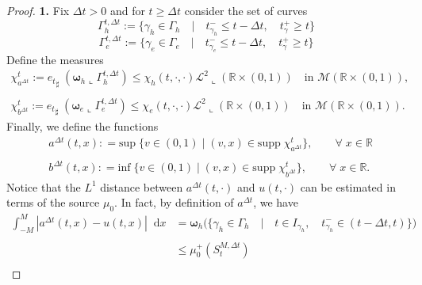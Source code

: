 \documentclass[10pt,a4paper]{amsart}
\newcommand*\dif{\mathop{}\!\mathrm{d}}
\newcommand{\bs}[1]{\boldsymbol{#1}}
\newcommand{\mr}[1]{\mathrm{#1}}
\newcommand{\msc}[1]{\mathscr{#1}}
\begin{document}
\begin{proof}
\vspace{0.5cm}
\textbf{1.} Fix $\Delta t > 0$ and for $t \geq \Delta t$ consider the set of curves
$$
\Gamma_h^{t, \Delta t} := \Big\{ \gamma_h \in \Gamma_h \quad \big| \quad t_{\gamma_h}^- \leq t-\Delta t, \quad t^+_\gamma \geq t \Big\}
$$
$$
\Gamma_e^{t, \Delta t} := \Big\{ \gamma_e \in \Gamma_e \quad \big| \quad t_{\gamma_e}^- \leq t-\Delta t, \quad t^+_\gamma \geq t \Big\}
$$
Define the measures 
\begin{equation}
    \begin{aligned}
        \chi^t_{a^{\Delta t}} := {e_t}_{\sharp} \;  (\bs \omega_h \llcorner \Gamma_h^{t, \Delta t}) \leq \chi_h(t, \cdot, \cdot )  \msc L^2 \llcorner ( \mathbb R \times (0, 1)) \quad \text{in $\msc M(\mathbb R\times (0, 1))$},& \\
        & \\
         \chi^t_{b^{\Delta t}} := {e_t}_{\sharp} \;  (\bs \omega_e \llcorner \Gamma_e^{t, \Delta t}) \leq \chi_e(t, \cdot, \cdot )  \msc L^2 \llcorner ( \mathbb R \times (0, 1)) \quad \text{in $\msc M(\mathbb R\times (0, 1))$}.
    \end{aligned}
\end{equation}
Finally, we define the functions
\begin{equation}
    \begin{aligned}
       &  a^{\Delta t}(t, x) : = \mr{sup} \; \Big\{ v \in (0, 1) \; \big| \;  (v, x) \in \mr{supp} \; \chi^t_{a^{\Delta t}} \Big\}, \qquad \forall \; x \in \mathbb R\\
       & \\
       &  b^{\Delta t}(t, x) : = \mr{inf} \; \Big\{ v\in (0, 1) \; \big| \;  (v, x) \in \mr{supp} \; \chi^t_{b^{\Delta t}} \Big\}, \qquad \forall \; x \in \mathbb R.
    \end{aligned}
\end{equation}
Notice that the $L^1$ distance between $a^{\Delta t}(t, \cdot)$ and $u(t, \cdot)$ can be estimated in terms of the source $\mu_0$. In fact, by definition of $a^{\Delta t}$, we have
\begin{equation}
\begin{aligned}
    \int_{-M}^M |a^{\Delta t}(t, x) -u(t, x) | \dif x & = \bs \omega_h\Big(\Big\{ \gamma_h \in \Gamma_h \quad \big| \quad t \in I_{\gamma_h}, \quad t^-_{\gamma_h} \in (t-\Delta t, t)\Big\}\Big)\\
    & \\
    & \leq \mu_0^+(S_t^{M, \Delta t})\\
    \end{aligned}

\end{equation}
\end{proof}
\end{document}

